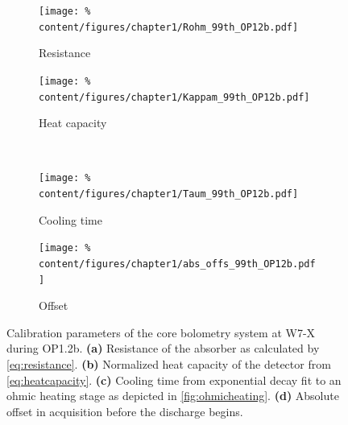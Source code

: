%
            \begin{figure}[t]%
                \centering%
                \begin{subfigure}{0.48\textwidth}%
                    \texttt{[image: \%
                        content/figures/chapter1/Rohm\_99th\_OP12b.pdf]}%
                    \caption{Resistance}\label{fig:stat_resistance}%
                \end{subfigure}%
                \hfill%
                \begin{subfigure}{0.48\textwidth}%
                    \texttt{[image: \%
                        content/figures/chapter1/Kappam\_99th\_OP12b.pdf]}%
                    \caption{Heat capacity}\label{fig:stat_heatcapacity}%
                \end{subfigure}%
                \\%
                \begin{subfigure}{0.48\textwidth}%
                    \texttt{[image: \%
                        content/figures/chapter1/Taum\_99th\_OP12b.pdf]}%
                    \caption{Cooling time}\label{fig:stat_coolingtime}%
                \end{subfigure}%
                \hfill%
                \begin{subfigure}{0.48\textwidth}%
                    \texttt{[image: \%
                        content/figures/chapter1/abs\_offs\_99th\_OP12b.pdf]}%
                    \caption{Offset}\label{fig:stat_offset}%
                \end{subfigure}%
                \caption{Calibration parameters of the core bolometry system at W7-X during OP1.2b. \textbf{(a)} Resistance of the absorber as calculated by \cref{eq:resistance}. \textbf{(b)} Normalized heat capacity of the detector from \cref{eq:heatcapacity}. \textbf{(c)} Cooling time from exponential decay fit to an ohmic heating stage as depicted in \cref{fig:ohmicheating}. \textbf{(d)} Absolute offset in acquisition before the discharge begins.}\label{fig:opstatistics1}%
            \end{figure}%
%
